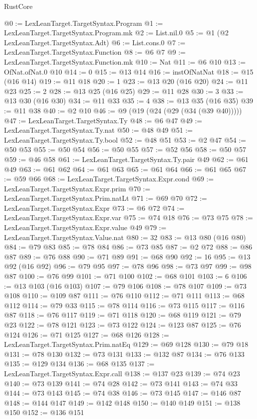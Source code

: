 \begin{lexlean}{RustCore}
\begin{coremodule}
@0 := LexLeanTarget.TargetSyntax.Program
@1 := LexLeanTarget.TargetSyntax.Program.mk
@2 := List.nil.{0}
@5 := @1 (@2 LexLeanTarget.TargetSyntax.Adt)
@6 := List.cons.{0}
@7 := LexLeanTarget.TargetSyntax.Function
@8 := @6 @7
@9 := LexLeanTarget.TargetSyntax.Function.mk
@10 := Nat
@11 := @6 @10
@13 := OfNat.ofNat.{0} @10
@14 := 0
@15 := @13 @14
@16 := instOfNatNat
@18 := @15 (@16 @14)
@19 := @11 @18
@20 := 1
@23 := @13 @20 (@16 @20)
@24 := @11 @23
@25 := 2
@28 := @13 @25 (@16 @25)
@29 := @11 @28
@30 := 3
@33 := @13 @30 (@16 @30)
@34 := @11 @33
@35 := 4
@38 := @13 @35 (@16 @35)
@39 := @11 @38
@40 := @2 @10
@46 := @9 (@19 (@24 (@29 (@34 (@39 @40)))))
@47 := LexLeanTarget.TargetSyntax.Ty
@48 := @6 @47
@49 := LexLeanTarget.TargetSyntax.Ty.nat
@50 := @48 @49
@51 := LexLeanTarget.TargetSyntax.Ty.bool
@52 := @48 @51
@53 := @2 @47
@54 := @50 @53
@55 := @50 @54
@56 := @50 @55
@57 := @52 @56
@58 := @50 @57
@59 := @46 @58
@61 := LexLeanTarget.TargetSyntax.Ty.pair @49
@62 := @61 @49
@63 := @61 @62
@64 := @61 @63
@65 := @61 @64
@66 := @61 @65
@67 := @59 @66
@68 := LexLeanTarget.TargetSyntax.Expr.cond
@69 := LexLeanTarget.TargetSyntax.Expr.prim
@70 := LexLeanTarget.TargetSyntax.Prim.natLt
@71 := @69 @70
@72 := LexLeanTarget.TargetSyntax.Expr
@73 := @6 @72
@74 := LexLeanTarget.TargetSyntax.Expr.var
@75 := @74 @18
@76 := @73 @75
@78 := LexLeanTarget.TargetSyntax.Expr.value @49
@79 := LexLeanTarget.TargetSyntax.Value.nat
@80 := 32
@83 := @13 @80 (@16 @80)
@84 := @79 @83
@85 := @78 @84
@86 := @73 @85
@87 := @2 @72
@88 := @86 @87
@89 := @76 @88
@90 := @71 @89
@91 := @68 @90
@92 := 16
@95 := @13 @92 (@16 @92)
@96 := @79 @95
@97 := @78 @96
@98 := @73 @97
@99 := @98 @87
@100 := @76 @99
@101 := @71 @100
@102 := @68 @101
@103 := 6
@106 := @13 @103 (@16 @103)
@107 := @79 @106
@108 := @78 @107
@109 := @73 @108
@110 := @109 @87
@111 := @76 @110
@112 := @71 @111
@113 := @68 @112
@114 := @79 @33
@115 := @78 @114
@116 := @73 @115
@117 := @116 @87
@118 := @76 @117
@119 := @71 @118
@120 := @68 @119
@121 := @79 @23
@122 := @78 @121
@123 := @73 @122
@124 := @123 @87
@125 := @76 @124
@126 := @71 @125
@127 := @68 @126
@128 := LexLeanTarget.TargetSyntax.Prim.natEq
@129 := @69 @128
@130 := @79 @18
@131 := @78 @130
@132 := @73 @131
@133 := @132 @87
@134 := @76 @133
@135 := @129 @134
@136 := @68 @135
@137 := LexLeanTarget.TargetSyntax.Expr.call
@138 := @137 @23
@139 := @74 @23
@140 := @73 @139
@141 := @74 @28
@142 := @73 @141
@143 := @74 @33
@144 := @73 @143
@145 := @74 @38
@146 := @73 @145
@147 := @146 @87
@148 := @144 @147
@149 := @142 @148
@150 := @140 @149
@151 := @138 @150
@152 := @136 @151

\end{coremodule}
\end{lexlean}
